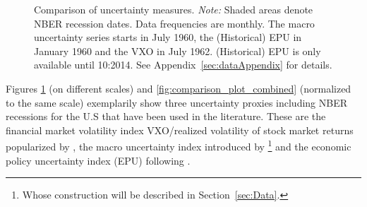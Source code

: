 \documentclass[a4paper,11pt,listof=nochaptergap,oneside,pointednumbers,bibtotoc,bigheadings,liststotoc,hidelinks]{scrbook}
\theoremstyle{mysatz}
\theoremstyle{mydefinition}
\theoremstyle{mytheorem}
\theoremstyle{mybemerkung}
\begin{document}
\begin{figure}[!ht]
   \centering
   \setlength\fboxsep{0pt}
   \setlength\fboxrule{0pt}
      \caption[Comparison of uncertainty measures.]{Comparison of uncertainty measures.
      \textit{Note:} Shaded areas denote NBER recession dates. Data frequencies are monthly. The macro uncertainty series starts in July 1960, the (Historical) EPU in January 1960 and the VXO in July 1962. (Historical) EPU is only available until 10:2014. See Appendix~\ref{sec:dataAppendix} for details.}   \label{fig:comparison_plot}
\end{figure}

Figures \ref{fig:comparison_plot} (on different scales) and \ref{fig:comparison_plot_combined} (normalized to the same scale) exemplarily show three uncertainty proxies including NBER recessions for the U.S that have been used in the literature. These are the financial market volatility index VXO/realized volatility of stock market returns popularized by \citet{bloom:09}, the macro uncertainty index introduced by \citet{juradoetal:15}\footnote{Whose construction will be described in Section~\ref{sec:Data}.} and the economic policy uncertainty index (EPU) following \citet{bakeretal:15}.
\end{document}
